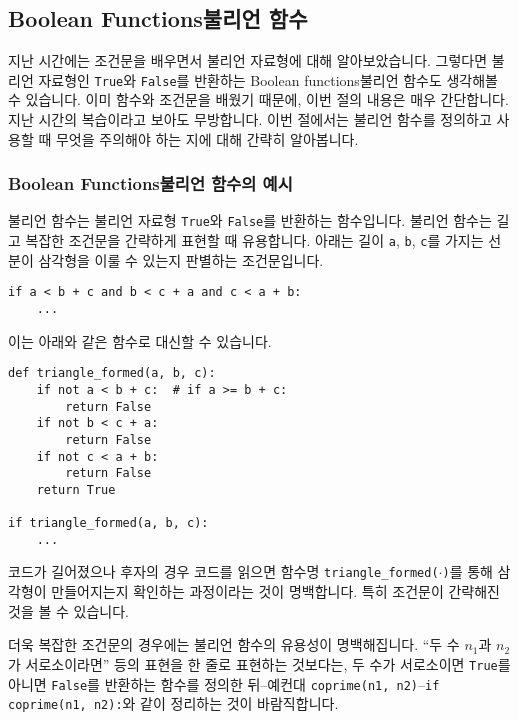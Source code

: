 \documentclass[../main.tex]{subfiles}
\begin{document}
\subsection{Boolean Functions불리언 함수}
지난 시간에는 조건문을 배우면서 불리언 자료형에 대해 알아보았습니다.
그렇다면 불리언 자료형인 \texttt{True}와 \texttt{False}를 반환하는 Boolean functions불리언 함수도 생각해볼 수 있습니다.
이미 함수와 조건문을 배웠기 때문에, 이번 절의 내용은 매우 간단합니다.
지난 시간의 복습이라고 보아도 무방합니다.
이번 절에서는 불리언 함수를 정의하고 사용할 때 무엇을 주의해야 하는 지에 대해 간략히 알아봅니다.

\subsubsection{Boolean Functions불리언 함수의 예시}
불리언 함수는 불리언 자료형 \texttt{True}와 \texttt{False}를 반환하는 함수입니다.
불리언 함수는 길고 복잡한 조건문을 간략하게 표현할 때 유용합니다.
아래는 길이 \texttt{a}, \texttt{b}, \texttt{c}를 가지는 선분이 삼각형을 이룰 수 있는지 판별하는 조건문입니다.
\begin{verbatim}
if a < b + c and b < c + a and c < a + b:
	...
\end{verbatim} 
이는 아래와 같은 함수로 대신할 수 있습니다.
\begin{verbatim}
def triangle_formed(a, b, c):
	if not a < b + c:  # if a >= b + c:
		return False
	if not b < c + a:
		return False
	if not c < a + b:
		return False
	return True

if triangle_formed(a, b, c):
	...
\end{verbatim}
코드가 길어졌으나 후자의 경우 코드를 읽으면 함수명 \texttt{triangle\_formed($\cdot$)}를 통해 삼각형이 만들어지는지 확인하는 과정이라는 것이 명백합니다.
특히 조건문이 간략해진 것을 볼 수 있습니다.

더욱 복잡한 조건문의 경우에는 불리언 함수의 유용성이 명백해집니다.
``두 수 $n_1$과 $n_2$가 서로소이라면'' 등의 표현을 한 줄로 표현하는 것보다는, 두 수가 서로소이면 \texttt{True}를 아니면 \texttt{False}를 반환하는 함수를 정의한 뒤--예컨대 \texttt{coprime(n1, n2)}--\texttt{if coprime(n1, n2):}와 같이 정리하는 것이 바람직합니다.
\end{document}
